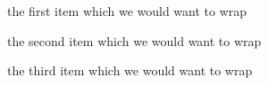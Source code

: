 

\item the first item which we would want to wrap
\item the second
      item which we
      would want to
      wrap
\item the third item which we would want to wrap

